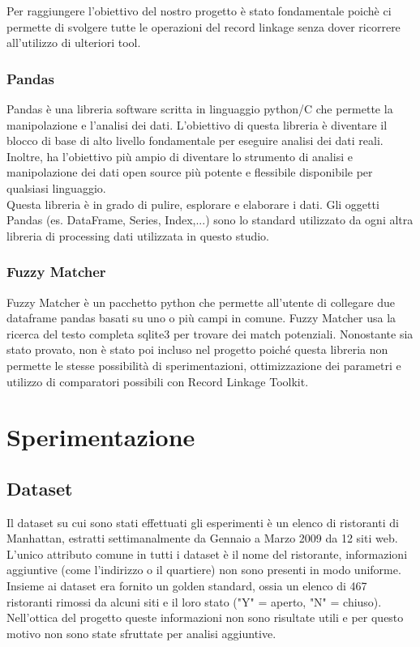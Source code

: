 \documentclass[a4paper,12pt]{article}
\begin{document}
\noindent Per raggiungere l'obiettivo del nostro progetto è stato fondamentale poichè ci permette di svolgere tutte le operazioni del record linkage senza dover ricorrere all'utilizzo di ulteriori tool.

\subsubsection{Pandas}
Pandas è una libreria software scritta in linguaggio python/C che permette la manipolazione e l'analisi dei dati. L'obiettivo di questa libreria è diventare il blocco di base di alto livello fondamentale per eseguire analisi dei dati reali. Inoltre, ha l'obiettivo più ampio di diventare lo strumento di analisi e manipolazione dei dati open source più potente e flessibile disponibile per qualsiasi linguaggio.\\
\noindent Questa libreria è in grado di pulire, esplorare e elaborare i dati. Gli oggetti Pandas (es. DataFrame, Series, Index,...) sono lo standard utilizzato da ogni altra libreria di processing dati utilizzata in questo studio.

\subsubsection{Fuzzy Matcher}
Fuzzy Matcher è un pacchetto python che permette all'utente di collegare due dataframe pandas basati su uno o più campi in comune. Fuzzy Matcher usa la ricerca del testo completa sqlite3 per trovare dei match potenziali. Nonostante sia stato provato, non è stato poi incluso nel progetto poiché questa libreria non permette le stesse possibilità di sperimentazioni, ottimizzazione dei parametri e utilizzo di comparatori possibili con Record Linkage Toolkit.

\newpage
\section{Sperimentazione}

\subsection{Dataset}
Il dataset su cui sono stati effettuati gli esperimenti è un elenco di ristoranti di Manhattan, estratti settimanalmente da Gennaio a Marzo 2009 da 12 siti web. L'unico attributo comune in tutti i dataset è il nome del ristorante, informazioni aggiuntive (come l'indirizzo o il quartiere) non sono presenti in modo uniforme.
Insieme ai dataset era fornito un golden standard, ossia un elenco di 467 ristoranti rimossi da alcuni siti e il loro stato ("Y" = aperto, "N" = chiuso). Nell'ottica del progetto queste informazioni non sono risultate utili e per questo motivo non sono state sfruttate per analisi aggiuntive.
\end{document}
